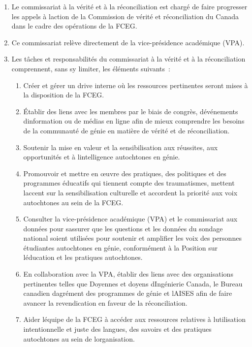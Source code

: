 \begin{enumerate}
 \item
  Le commissariat à la vérité et à la réconciliation est chargé de faire progresser les appels à l\textquotesingle action de la Commission de vérité et réconciliation du Canada dans le cadre des opérations de la FCEG.
 \item
  Ce commissariat relève directement de la vice-présidence académique (VPA).
 \item
  Les tâches et responsabilités du commissariat à la vérité et à la réconciliation comprennent, sans s\textquotesingle y limiter, les éléments suivants~:

  \begin{enumerate}
   \item
    Créer et gérer un drive interne où les ressources pertinentes seront mises à la disposition de la FCEG.
   \item
    Établir des liens avec les membres par le biais de congrès, d\textquotesingle événements d\textquotesingle information ou de médias en ligne afin de mieux comprendre les besoins de la communauté de génie en matière de vérité et de réconciliation.
   \item
    Soutenir la mise en valeur et la sensibilisation aux réussites, aux opportunités et à l\textquotesingle intelligence autochtones en génie.
   \item
    Promouvoir et mettre en œuvre des pratiques, des politiques et des programmes éducatifs qui tiennent compte des traumatismes, mettent l\textquotesingle accent sur la sensibilisation culturelle et accordent la priorité aux voix autochtones au sein de la FCEG.
   \item
    Consulter la vice-présidence académique (VPA) et le commissariat aux données pour s\textquotesingle assurer que les questions et les données du sondage national soient utilisées pour soutenir et amplifier les voix des personnes étudiantes autochtones en génie, conformément à la Position sur l\textquotesingle éducation et les pratiques autochtones.
   \item
    En collaboration avec la VPA, établir des liens avec des organisations pertinentes telles que Doyennes et doyens d\textquotesingle Ingénierie Canada, le Bureau canadien d\textquotesingle agrément des programmes de génie et l\textquotesingle AISES afin de faire avancer la revendication en faveur de la réconciliation.
   \item
    Aider l\textquotesingle équipe de la FCEG à accéder aux ressources relatives à l\textquotesingle utilisation intentionnelle et juste des langues, des savoirs et des pratiques autochtones au sein de l\textquotesingle organisation.
  \end{enumerate}


\end{enumerate}
